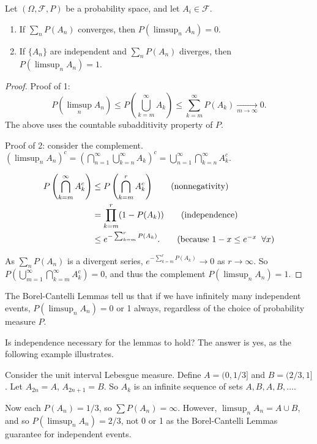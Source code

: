 \documentclass[11pt,fleqn]{book} %
\begin{document}
\begin{theorem} \label{thm:borel-cantelli}
	Let $(\Omega,\mathcal{F},P)$ be a probability space, and let $A_i \in \mathcal{F}$.
	\begin{enumerate}
		\item If $\sum_n P(A_n)$ converges, then $P \left( \limsup_n A_n \right) = 0$.
		\item If $\{A_n\}$ are independent and $\sum_n P(A_n)$ diverges, then $P \left( \limsup_n A_n \right) = 1$.
	\end{enumerate}
\end{theorem}

\begin{proof}
	Proof of 1:
	\[
		P \left( \limsup_n A_n \right) \leq P \left( \bigcup_{k=m}^\infty A_k \right) \leq \sum_{k=m}^\infty P(A_k) \xrightarrow[m \to \infty]{} 0.
	\]
	The above uses the countable subadditivity property of $P$.

	Proof of 2: consider the complement. $(\limsup_n A_n)^c = (\bigcap_{n=1}^\infty \bigcup_{k=n}^\infty A_k)^c = \bigcup_{n=1}^\infty \bigcap_{k=n}^\infty A_k^c$.

	\begin{align*}
		P \left( \bigcap_{k=m}^\infty A_k^c \right) &\leq P \left( \bigcap_{k=m}^r A_k^c \right) \tag{nonnegativity} \\
		&= \prod_{k=m}^r (1-P(A_k)) \tag{independence} \\
		&\leq e^{-\sum_{k=m}^r P(A_k)}. \tag{because $1-x \leq e^{-x} \;\; \forall x$}
	\end{align*}

	As $\sum_n P(A_n)$ is a divergent series, $e^{-\sum_{k=m}^r P(A_k)} \to 0$ as $r \to \infty$. So $P(\bigcup_{m=1}^\infty \bigcap_{k=m}^\infty A_k^c) = 0$, and thus the complement $P(\limsup_n A_n) = 1$.
\end{proof}

The Borel-Cantelli Lemmas tell us that if we have infinitely many independent events, $P(\limsup_n A_n) = 0$ or 1 always, regardless of the choice of probability measure $P$.

Is independence necessary for the lemmas to hold? The answer is yes, as the following example illustrates.

\begin{example} \label{ex:2.1}
	Consider the unit interval Lebesgue measure. Define $A = (0,1/3]$ and $B = (2/3,1]$. Let $A_{2n} = A$, $A_{2n+1} = B$. So $A_k$ is an infinite sequence of sets $A, B, A, B, \dots$.

	Now each $P(A_n) = 1/3$, so $\sum P(A_n) = \infty$. However, $\limsup_n A_n = A \cup B$, and so $P(\limsup_n A_n) = 2/3$, not 0 or 1 as the Borel-Cantelli Lemmas guarantee for independent events.
\end{example}
\end{document}
